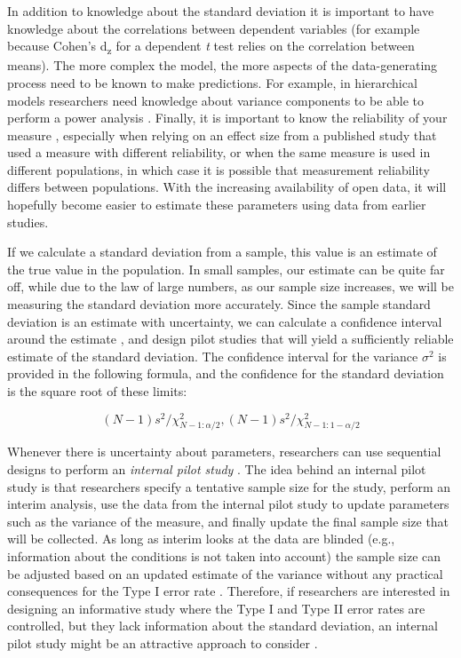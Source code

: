 \documentclass[
]{krantz}
\begin{document}
In addition to knowledge about the standard deviation it is important to have knowledge about the correlations between dependent variables (for example because Cohen's d\textsubscript{z} for a dependent \emph{t} test relies on the correlation between means). The more complex the model, the more aspects of the data-generating process need to be known to make predictions. For example, in hierarchical models researchers need knowledge about variance components to be able to perform a power analysis \citep{westfall_statistical_2014, debruine_understanding_2021}. Finally, it is important to know the reliability of your measure \citep{parsons_psychological_2019}, especially when relying on an effect size from a published study that used a measure with different reliability, or when the same measure is used in different populations, in which case it is possible that measurement reliability differs between populations. With the increasing availability of open data, it will hopefully become easier to estimate these parameters using data from earlier studies.

If we calculate a standard deviation from a sample, this value is an estimate of the true value in the population. In small samples, our estimate can be quite far off, while due to the law of large numbers, as our sample size increases, we will be measuring the standard deviation more accurately. Since the sample standard deviation is an estimate with uncertainty, we can calculate a confidence interval around the estimate \citep{smithson_confidence_2003}, and design pilot studies that will yield a sufficiently reliable estimate of the standard deviation. The confidence interval for the variance \(\sigma^2\) is provided in the following formula, and the confidence for the standard deviation is the square root of these limits:

\[(N - 1)s^2/\chi^2_{N-1:\alpha/2},(N - 1)s^2/\chi^2_{N-1:1-\alpha/2}\]

Whenever there is uncertainty about parameters, researchers can use sequential designs to perform an \emph{internal pilot study} \citep{wittes_role_1990}. The idea behind an internal pilot study is that researchers specify a tentative sample size for the study, perform an interim analysis, use the data from the internal pilot study to update parameters such as the variance of the measure, and finally update the final sample size that will be collected. As long as interim looks at the data are blinded (e.g., information about the conditions is not taken into account) the sample size can be adjusted based on an updated estimate of the variance without any practical consequences for the Type I error rate \citep{friede_sample_2006, proschan_two-stage_2005}. Therefore, if researchers are interested in designing an informative study where the Type I and Type II error rates are controlled, but they lack information about the standard deviation, an internal pilot study might be an attractive approach to consider \citep{chang_adaptive_2016}.
\end{document}
